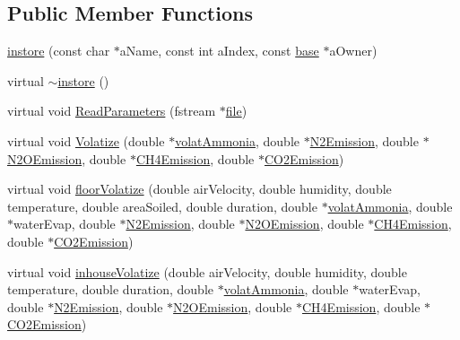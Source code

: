 \subsection*{Public Member Functions}
\begin{DoxyCompactItemize}
\item 
\hyperlink{classinstore_a3ee4eec37f131b9eb5e2ff5072caafed}{instore} (const char $\ast$aName, const int aIndex, const \hyperlink{classbase}{base} $\ast$aOwner)
\item 
virtual \hyperlink{classinstore_aab1ed501097338b080ad6818f4f3c26a}{$\sim$instore} ()
\item 
virtual void \hyperlink{classinstore_a5f289ba185023e4b7c15d82e79d1ac7f}{ReadParameters} (fstream $\ast$\hyperlink{classbase_a3af52ee9891719d09b8b19b42450b6f6}{file})
\item 
virtual void \hyperlink{classinstore_ae11c6905a5d87e26fb8662e202faa188}{Volatize} (double $\ast$\hyperlink{classmanurestore_ac9d398e432684fb02bfaf52c2f0e9ae8}{volatAmmonia}, double $\ast$\hyperlink{classmanurestore_a9a8d525f55145b43f2ab275fb9b5f35f}{N2Emission}, double $\ast$\hyperlink{classmanurestore_aca5ad359219f1f6c9a957f03156136ab}{N2OEmission}, double $\ast$\hyperlink{classmanurestore_ae472072caaaea49932fe2152e6a4fb09}{CH4Emission}, double $\ast$\hyperlink{classmanurestore_aebc6ae97114292e973c57cbc2ecc4f84}{CO2Emission})
\item 
virtual void \hyperlink{classinstore_a4a0d001c67c2611871505d71269a3fce}{floorVolatize} (double airVelocity, double humidity, double temperature, double areaSoiled, double duration, double $\ast$\hyperlink{classmanurestore_ac9d398e432684fb02bfaf52c2f0e9ae8}{volatAmmonia}, double $\ast$waterEvap, double $\ast$\hyperlink{classmanurestore_a9a8d525f55145b43f2ab275fb9b5f35f}{N2Emission}, double $\ast$\hyperlink{classmanurestore_aca5ad359219f1f6c9a957f03156136ab}{N2OEmission}, double $\ast$\hyperlink{classmanurestore_ae472072caaaea49932fe2152e6a4fb09}{CH4Emission}, double $\ast$\hyperlink{classmanurestore_aebc6ae97114292e973c57cbc2ecc4f84}{CO2Emission})
\item 
virtual void \hyperlink{classinstore_a840256bcb3fe9248c741f2b0b22ff2e0}{inhouseVolatize} (double airVelocity, double humidity, double temperature, double duration, double $\ast$\hyperlink{classmanurestore_ac9d398e432684fb02bfaf52c2f0e9ae8}{volatAmmonia}, double $\ast$waterEvap, double $\ast$\hyperlink{classmanurestore_a9a8d525f55145b43f2ab275fb9b5f35f}{N2Emission}, double $\ast$\hyperlink{classmanurestore_aca5ad359219f1f6c9a957f03156136ab}{N2OEmission}, double $\ast$\hyperlink{classmanurestore_ae472072caaaea49932fe2152e6a4fb09}{CH4Emission}, double $\ast$\hyperlink{classmanurestore_aebc6ae97114292e973c57cbc2ecc4f84}{CO2Emission})

\end{DoxyCompactItemize}
